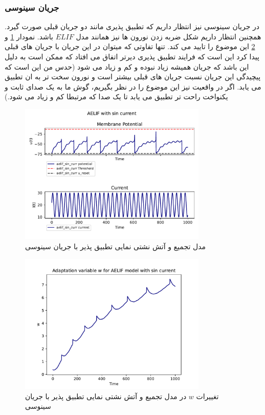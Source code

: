 \documentclass{article}
\begin{document}
            \subsubsection{جریان سینوسی}
                در جریان سینوسی نیز انتظار داریم که تطبیق پذیری مانند دو جریان قبلی صورت گیرد. همچنین انتظار داریم شکل ضربه زدن نورون ها نیز همانند مدل 
                $ELIF$ 
                باشد. نمودار 
                \ref{fig:aelif-sin-curr} و 
                \ref{fig:aelif-w-sin-curr}
                این موضوع را تایید می کند. تنها تفاوتی که میتوان در این جریان با جریان های قبلی پیدا کرد این است که فرایند تطبیق پذیری دیرتر اتفاق می افتاد که ممکن است به دلیل این باشد که جریان همیشه زیاد نبوده و کم و زیاد می شود
                (حدس من این است که پیچیدگی این جریان نسبت جریان های قبلی بیشتر است و نورون سخت تر به ان تطبیق می یابد. اگر در واقعیت نیز این موضوع را در نظر بگیریم، گوش ما به یک صدای ثابت و یکنواخت راحت تر تطبیق می یابد تا یک صدا که مرتبطا کم و زیاد می شود.)
                \begin{figure}[H]
                    \centering
                    \includegraphics[width=0.8\textwidth]{plots/AELIF with sin current.pdf} 
                    \caption{مدل تجمیع و آتش نشتی نمایی تطبیق پذیر با جریان سینوسی}
                    \label{fig:aelif-sin-curr}
                \end{figure}
                \begin{figure}[H]
                    \centering
                    \includegraphics[width=0.8\textwidth]{plots/Adaptation variable w for AELIF model with sin current.pdf} 
                    \caption{تغییرات $w$ در مدل تجمیع و آتش نشتی نمایی تطبیق پذیر با جریان سینوسی}
                    \label{fig:aelif-w-sin-curr}
                \end{figure}
\end{document}
